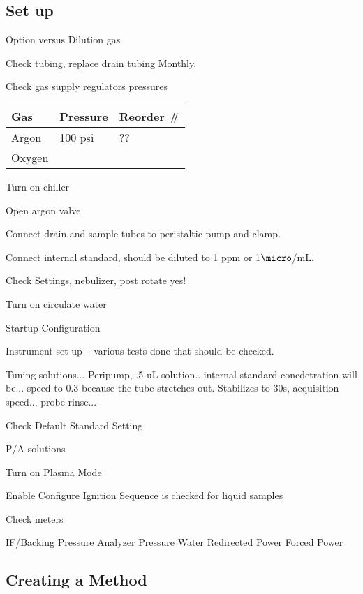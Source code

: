\documentclass[12pt]{../SOP3_beta}
\begin{document}
\subsection{Set up}

\NP Option versus Dilution gas

\NP Check tubing, replace drain tubing Monthly.

\NP Check gas supply regulators pressures

\begin{table}[h]
\begin{tabular}{lll} \hline
Gas   &     Pressure    & Reorder \# \\ \hline\hline
Argon &       100 psi   & ??          \\
Oxygen&                 & \\ \hline

\end{tabular}
\end{table}

\NP Turn on chiller

\NP Open argon valve

\NP Connect drain and sample tubes to peristaltic pump and clamp.

\NP Connect internal standard, should be diluted to 1 ppm or 1$\micro$/mL. 

\NP Check Settings, nebulizer, post rotate yes!

\NP Turn on circulate water

\NP Startup Configuration

\NP Instrument set up -- various tests done that should be checked.

\NP Tuning solutions... Peripump, .5 uL solution.. internal standard concdetration will be...  speed to 0.3 because the tube stretches out. Stabilizes to 30s, acquisition speed... probe rinse... 

\NP Check Default Standard Setting

\NP P/A solutions

\NP Turn on Plasma Mode 

\NP Enable Configure Ignition Sequence is checked for liquid samples

\NP Check meters 

IF/Backing Pressure
Analyzer Pressure
Water
Redirected Power
Forced Power



\NP 


\subsection{Creating a Method}
\end{document}
